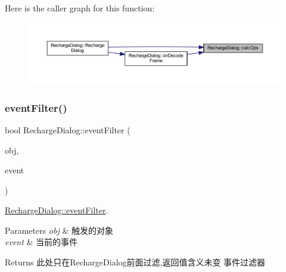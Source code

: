 Here is the caller graph for this function\+:
\nopagebreak
\begin{figure}[H]
\begin{center}
\leavevmode
\includegraphics[width=350pt]{class_recharge_dialog_a9048dce00d14b245f88e8059db81db63_icgraph}
\end{center}
\end{figure}
\mbox{\label{class_recharge_dialog_a3a39227ec39401c1735b7280c2744a8c}} 
\subsubsection{\texorpdfstring{eventFilter()}{eventFilter()}}
{\footnotesize\ttfamily bool Recharge\+Dialog\+::event\+Filter (\begin{DoxyParamCaption}\item[{Q\+Object $\ast$}]{obj,  }\item[{Q\+Event $\ast$}]{event }\end{DoxyParamCaption})\hspace{0.3cm}{\ttfamily [protected]}}



\mbox{\hyperlink{class_recharge_dialog_a3a39227ec39401c1735b7280c2744a8c}{Recharge\+Dialog\+::event\+Filter}}. 


\begin{DoxyParams}{Parameters}
{\em obj} & 触发的对象 \\
\hline
{\em event} & 当前的事件 \\
\hline
\end{DoxyParams}
\begin{DoxyReturn}{Returns}
此处只在\+Recharge\+Dialog前面过滤,返回值含义未变 事件过滤器 
\end{DoxyReturn}
\mbox{\label{class_recharge_dialog_a39a0878875f9127332f474cac43d1ed3}} 
